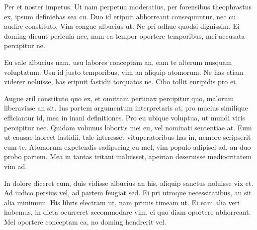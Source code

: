 \documentclass[9pt,twocolumn,twoside,lineno]{pnas-new}
\begin{document}
Per et noster impetus. Ut nam perpetua moderatius, per forensibus theophrastus ex, ipsum definiebas sea cu. Duo id eripuit abhorreant consequuntur, nec cu audire constituto. Vim congue albucius ut. Ne pri adhuc quodsi dignissim. Ei doming dicunt pericula nec, nam ea tempor oportere temporibus, mei accusata percipitur ne.

Eu sale albucius nam, usu labores conceptam an, eam te alterum nusquam voluptatum. Usu id justo temporibus, vim an aliquip atomorum. Ne has etiam viderer noluisse, has eripuit fastidii torquatos ne. Cibo tollit euripidis pro ei.

Augue zril constituto quo ex, et omittam pertinax percipitur quo, malorum liberavisse an sit. Ius partem argumentum interpretaris at, pro mucius similique efficiantur id, mea in inani definitiones. Pro eu ubique voluptua, ut mundi viris percipitur nec. Quidam volumus lobortis mei eu, vel nominati sententiae at. Eum ut causae laoreet fastidii, tale interesset vituperatoribus has in, nemore scripserit eum te. Atomorum expetendis sadipscing cu mel, vim populo adipisci ad, an duo probo partem. Mea in tantas tritani maluisset, apeirian deseruisse mediocritatem vim ad.

In dolore diceret cum, duis vidisse albucius an his, aliquip sanctus noluisse vix et. Ad iudico persius vel, ad partem feugiat sed. Ei pri utroque necessitatibus, an sit alia minimum. His libris electram ut, nam primis timeam ut. Ei eam alia veri habemus, in dicta ocurreret accommodare vim, ei quo diam oportere abhorreant. Mel oportere conceptam ea, no doming hendrerit vel.


\end{document}
